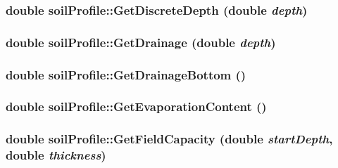 \label{classsoil_profile_a27959c28ab4031f581b0e17142a45b7f}
\hypertarget{classsoil_profile_a92895ed75f2779eb7a9468a4e5662f4e}{
\subsubsection[{GetDiscreteDepth}]{\setlength{\rightskip}{0pt plus 5cm}double soilProfile::GetDiscreteDepth (double {\em depth})}}
\label{classsoil_profile_a92895ed75f2779eb7a9468a4e5662f4e}
\hypertarget{classsoil_profile_a46d21083a35260e54710785e8b9b8249}{
\subsubsection[{GetDrainage}]{\setlength{\rightskip}{0pt plus 5cm}double soilProfile::GetDrainage (double {\em depth})}}
\label{classsoil_profile_a46d21083a35260e54710785e8b9b8249}
\hypertarget{classsoil_profile_a1804fcac2fb377b4c1a783b033b1ef7a}{
\subsubsection[{GetDrainageBottom}]{\setlength{\rightskip}{0pt plus 5cm}double soilProfile::GetDrainageBottom ()}}
\label{classsoil_profile_a1804fcac2fb377b4c1a783b033b1ef7a}
\hypertarget{classsoil_profile_a839de879376f19c2408171cfb82c71e1}{
\subsubsection[{GetEvaporationContent}]{\setlength{\rightskip}{0pt plus 5cm}double soilProfile::GetEvaporationContent ()}}
\label{classsoil_profile_a839de879376f19c2408171cfb82c71e1}
\hypertarget{classsoil_profile_a6c154b0cb0b3ab611efde6f50d53cbc7}{
\subsubsection[{GetFieldCapacity}]{\setlength{\rightskip}{0pt plus 5cm}double soilProfile::GetFieldCapacity (double {\em startDepth}, \/  double {\em thickness})}}
